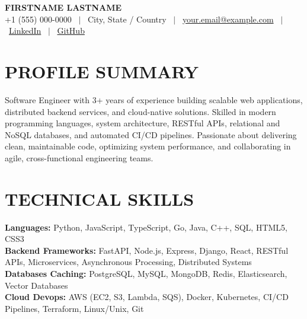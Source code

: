 \documentclass[letterpaper,10.5pt]{article}
\begin{document}
\begin{center}
    \textbf{\Huge \scshape FIRSTNAME LASTNAME} \\ \vspace{2pt}
    \small \color{NavyBlue} +1 (555) 000-0000 \ $|$ \ City, State / Country \ $|$ \ \href{mailto:your.email@example.com}{\color{NavyBlue}your.email@example.com} \ $|$ \ \href{https://www.linkedin.com/in/your-profile/}{\color{NavyBlue}LinkedIn} \ $|$ \ \href{https://github.com/your-username}{\color{NavyBlue}GitHub}
\end{center}

\section{PROFILE SUMMARY}
  \vspace{1pt}
  \small{
    Software Engineer with 3+ years of experience building scalable web applications, distributed backend services, and cloud-native solutions. Skilled in modern programming languages, system architecture, RESTful APIs, relational and NoSQL databases, and automated CI/CD pipelines. Passionate about delivering clean, maintainable code, optimizing system performance, and collaborating in agile, cross-functional engineering teams.
  }
  \vspace{-2pt}

\section{TECHNICAL SKILLS}
 \begin{itemize}[leftmargin=0.15in, label={}]
    \small{\item{
     \textbf{Languages:} Python, JavaScript, TypeScript, Go, Java, C++, SQL, HTML5, CSS3 \\ \vspace{1pt}
     \textbf{Backend Frameworks:} FastAPI, Node.js, Express, Django, React, RESTful APIs, Microservices, Asynchronous Processing, Distributed Systems \\ \vspace{1pt}
     \textbf{Databases Caching:} PostgreSQL, MySQL, MongoDB, Redis, Elasticsearch, Vector Databases \\ \vspace{1pt}
     \textbf{Cloud Devops:} AWS (EC2, S3, Lambda, SQS), Docker, Kubernetes, CI/CD Pipelines, Terraform, Linux/Unix, Git \\ \vspace{1pt}
    }}
 \end{itemize}
 \vspace{-14pt}
\end{document}
